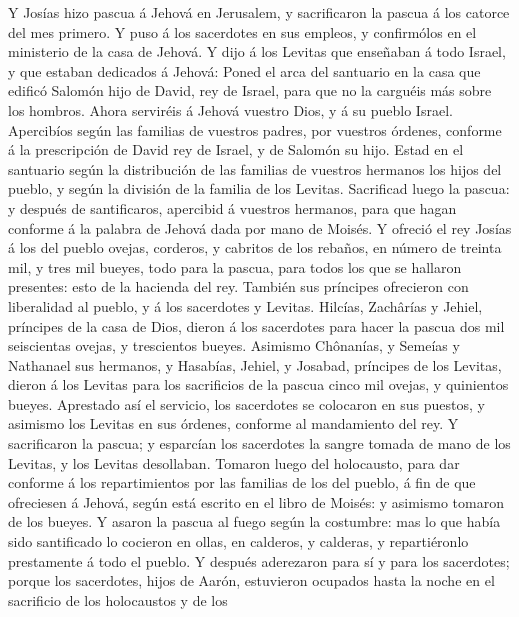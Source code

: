  Y Josías hizo pascua á Jehová en Jerusalem, y
sacrificaron la pascua á los catorce del mes primero.  Y
puso á los sacerdotes en sus empleos, y confirmólos en el ministerio de
la casa de Jehová.  Y dijo á los Levitas que enseñaban á
todo Israel, y que estaban dedicados á Jehová: Poned el arca del
santuario en la casa que edificó Salomón hijo de David, rey de Israel,
para que no la carguéis más sobre los hombros. Ahora serviréis á Jehová
vuestro Dios, y á su pueblo Israel.  Apercibíos según las
familias de vuestros padres, por vuestros órdenes, conforme á la
prescripción de David rey de Israel, y de Salomón su hijo.
 Estad en el santuario según la distribución de las
familias de vuestros hermanos los hijos del pueblo, y según la división
de la familia de los Levitas.  Sacrificad luego la pascua:
y después de santificaros, apercibid á vuestros hermanos, para que hagan
conforme á la palabra de Jehová dada por mano de Moisés. 
Y ofreció el rey Josías á los del pueblo ovejas, corderos, y cabritos de
los rebaños, en número de treinta mil, y tres mil bueyes, todo para la
pascua, para todos los que se hallaron presentes: esto de la hacienda
del rey.  También sus príncipes ofrecieron con liberalidad
al pueblo, y á los sacerdotes y Levitas. Hilcías, Zachârías y Jehiel,
príncipes de la casa de Dios, dieron á los sacerdotes para hacer la
pascua dos mil seiscientas ovejas, y trescientos bueyes. 
Asimismo Chônanías, y Semeías y Nathanael sus hermanos, y Hasabías,
Jehiel, y Josabad, príncipes de los Levitas, dieron á los Levitas para
los sacrificios de la pascua cinco mil ovejas, y quinientos bueyes.
 Aprestado así el servicio, los sacerdotes se colocaron
en sus puestos, y asimismo los Levitas en sus órdenes, conforme al
mandamiento del rey.  Y sacrificaron la pascua; y
esparcían los sacerdotes la sangre tomada de mano de los Levitas, y los
Levitas desollaban.  Tomaron luego del holocausto, para
dar conforme á los repartimientos por las familias de los del pueblo, á
fin de que ofreciesen á Jehová, según está escrito en el libro de
Moisés: y asimismo tomaron de los bueyes.  Y asaron la
pascua al fuego según la costumbre: mas lo que había sido santificado lo
cocieron en ollas, en calderos, y calderas, y repartiéronlo prestamente
á todo el pueblo.  Y después aderezaron para sí y para
los sacerdotes; porque los sacerdotes, hijos de Aarón, estuvieron
ocupados hasta la noche en el sacrificio de los holocaustos y de los
